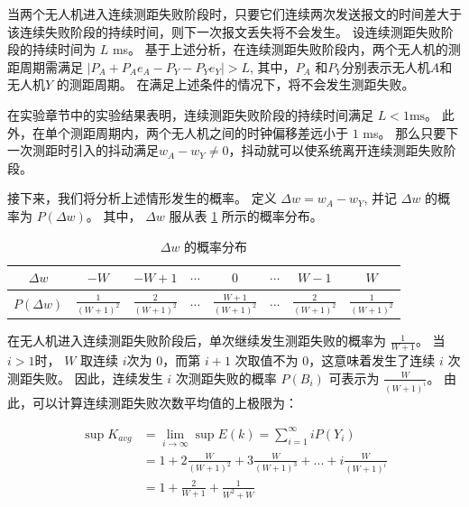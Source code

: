 当两个无人机进入连续测距失败阶段时，只要它们连续两次发送报文的时间差大于该连续失败阶段的持续时间，则下一次报文丢失将不会发生。
设连续测距失败阶段的持续时间为  $L$ ms。
基于上述分析，在连续测距失败阶段内，两个无人机的测距周期需满足 $\left | P_{A}+P_{A}e_{A}-P_{Y}-P_{Y}e_{Y}\right|>L$,
其中，$P_{A}$ 和$P_{Y}$分别表示无人机$A $和 无人机$Y$ 的测距周期。
在满足上述条件的情况下，将不会发生测距失败。

在实验章节中的实验结果表明，连续测距失败阶段的持续时间满足 $L<1 \text{ms}$。
此外，在单个测距周期内，两个无人机之间的时钟偏移差远小于 $1$ ms。
那么只要下一次测距时引入的抖动满足$w_{A}-w_{Y} \ne 0$，抖动就可以使系统离开连续测距失败阶段。

接下来，我们将分析上述情形发生的概率。
定义 $\Delta w = w_{A}-w_{Y}$, 并记 $\Delta w $ 的概率为 $P(\Delta w)$。
其中， $\Delta w $ 服从表 \ref{tab:Probabilityofdeltaw} 所示的概率分布。

\begin{table}[htbp]
  \centering
  \caption{$\Delta w$ 的概率分布}
  \label{tab:Probabilityofdeltaw}
  \begin{tabular}{|c|c|c|c|c|c|c|c|}
    \hline
    $\Delta w$ 
    & $-W$ 
    & $-W+1$ 
    & $\cdots$ 
    & $0$ 
    & $\cdots$ 
    & $W-1$ 
    & $W$ \\
    \hline
    $P(\Delta w)$ 
    & $\frac{1}{(W+1)^2}$ 
    & $\frac{2}{(W+1)^2}$ 
    & $\cdots$ 
    & $\frac{W+1}{(W+1)^2}$ 
    & $\cdots$ 
    & $\frac{2}{(W+1)^2}$ 
    & $\frac{1}{(W+1)^2}$ \\
    \hline
  \end{tabular}
\end{table}

在无人机进入连续测距失败阶段后，单次继续发生测距失败的概率为 $\frac{1}{W+1}$​ 。
 当$i >1$时， $W$ 取连续  $i$次为 $0$，而第 $i+1$ 次取值不为 $0$，这意味着发生了连续 $i$ 次测距失败。
 因此，连续发生 $i$ 次测距失败的概率  $P(B_{i})$ 可表示为 $\frac{W}{(W+1)^{i}}$。
 由此，可以计算连续测距失败次数平均值的上极限为：

\begin{equation}
\begin{aligned}
\sup K_{avg}&= \lim_{i \to \infty} \sup E(k)=\sum_{i=1}^{\infty} iP(Y_{i})\\
&=1+2\frac{W}{(W+1)^2}+3\frac{W}{(W+1)^3}+...+i\frac{W}{(W+1)^{i}}\\
&=1+\frac{2}{W+1}+\frac{1}{W^2+W}\\
\end{aligned}
\end{equation}

